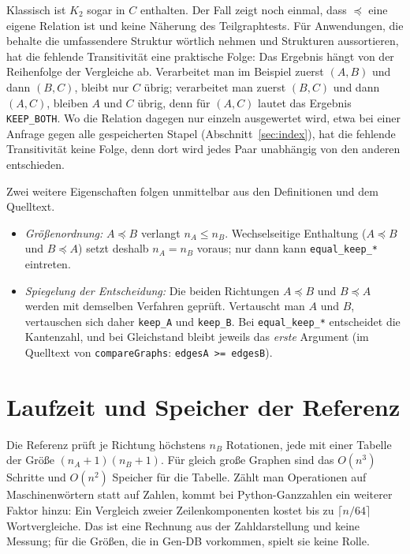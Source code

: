 Klassisch ist $K_2$ sogar in $C$ enthalten. Der Fall zeigt noch einmal, dass $\preceq$ eine eigene Relation ist und keine Näherung des Teilgraphtests. Für Anwendungen, die \glqq behalte die umfassendere Struktur\grqq{} wörtlich nehmen und Strukturen aussortieren, hat die fehlende Transitivität eine praktische Folge: Das Ergebnis hängt von der Reihenfolge der Vergleiche ab. Verarbeitet man im Beispiel zuerst $(A,B)$ und dann $(B,C)$, bleibt nur $C$ übrig; verarbeitet man zuerst $(B,C)$ und dann $(A,C)$, bleiben $A$ und $C$ übrig, denn für $(A,C)$ lautet das Ergebnis \texttt{KEEP\_BOTH}. Wo die Relation dagegen nur einzeln ausgewertet wird, etwa bei einer Anfrage gegen alle gespeicherten Stapel (Abschnitt~\ref{sec:index}), hat die fehlende Transitivität keine Folge, denn dort wird jedes Paar unabhängig von den anderen entschieden.

Zwei weitere Eigenschaften folgen unmittelbar aus den Definitionen und dem Quelltext.

\begin{itemize}
	\item \emph{Größenordnung:} $A\preceq B$ verlangt $n_A\le n_B$. Wechselseitige Enthaltung ($A\preceq B$ und $B\preceq A$) setzt deshalb $n_A=n_B$ voraus; nur dann kann \texttt{equal\_keep\_*} eintreten.
	\item \emph{Spiegelung der Entscheidung:} Die beiden Richtungen $A\preceq B$ und $B\preceq A$ werden mit demselben Verfahren geprüft. Vertauscht man $A$ und $B$, vertauschen sich daher \texttt{keep\_A} und \texttt{keep\_B}. Bei \texttt{equal\_keep\_*} entscheidet die Kantenzahl, und bei Gleichstand bleibt jeweils das \emph{erste} Argument (im Quelltext von \texttt{compareGraphs}: \texttt{edgesA >= edgesB}).
\end{itemize}

\section{Laufzeit und Speicher der Referenz}
\label{sec:py_laufzeit}

Die Referenz prüft je Richtung höchstens $n_B$ Rotationen, jede mit einer Tabelle der Größe $(n_A+1)(n_B+1)$. Für gleich große Graphen sind das $O(n^3)$ Schritte und $O(n^2)$ Speicher für die Tabelle. Zählt man Operationen auf Maschinenwörtern statt auf Zahlen, kommt bei Python-Ganzzahlen ein weiterer Faktor hinzu: Ein Vergleich zweier Zeilenkomponenten kostet bis zu $\lceil n/64\rceil$ Wortvergleiche. Das ist eine Rechnung aus der Zahldarstellung und keine Messung; für die Größen, die in Gen-DB vorkommen, spielt sie keine Rolle.

